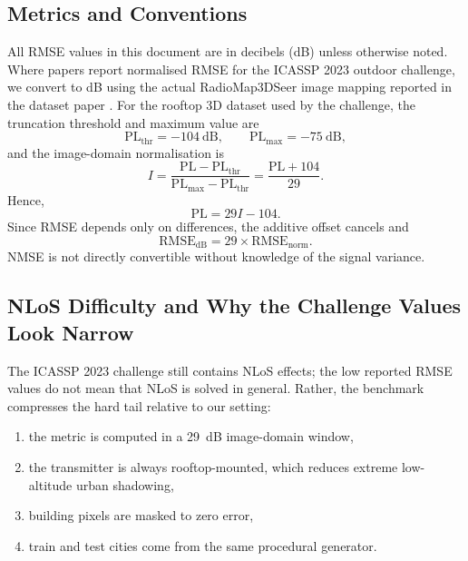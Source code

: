 \documentclass[11pt,a4paper]{article}
\begin{document}
\subsection{Metrics and Conventions}

All RMSE values in this document are in decibels (dB) unless otherwise noted.
Where papers report normalised RMSE for the ICASSP 2023 outdoor challenge, we
convert to dB using the actual RadioMap3DSeer image mapping reported in the
dataset paper \cite{dataset2212}. For the rooftop 3D dataset used by the challenge,
the truncation threshold and maximum value are
\[
    \mathrm{PL}_{\mathrm{thr}} = -104~\mathrm{dB}, \qquad
    \mathrm{PL}_{\max} = -75~\mathrm{dB},
\]
and the image-domain normalisation is
\begin{equation}
    I = \frac{\mathrm{PL} - \mathrm{PL}_{\mathrm{thr}}}
    {\mathrm{PL}_{\max} - \mathrm{PL}_{\mathrm{thr}}}
    = \frac{\mathrm{PL} + 104}{29}.
\end{equation}
Hence,
\begin{equation}
    \mathrm{PL} = 29I - 104.
\end{equation}
Since RMSE depends only on differences, the additive offset cancels and
\begin{equation}
    \mathrm{RMSE}_\mathrm{dB} = 29 \times \mathrm{RMSE}_\mathrm{norm}.
\end{equation}
NMSE is not directly convertible without knowledge of the signal variance.

\subsection{NLoS Difficulty and Why the Challenge Values Look Narrow}

The ICASSP 2023 challenge still contains NLoS effects; the low reported RMSE
values do not mean that NLoS is solved in general. Rather, the benchmark
compresses the hard tail relative to our setting:
\begin{enumerate}[nosep]
    \item the metric is computed in a 29~dB image-domain window,
    \item the transmitter is always rooftop-mounted, which reduces extreme
          low-altitude urban shadowing,
    \item building pixels are masked to zero error,
    \item train and test cities come from the same procedural generator.
\end{enumerate}
\end{document}
